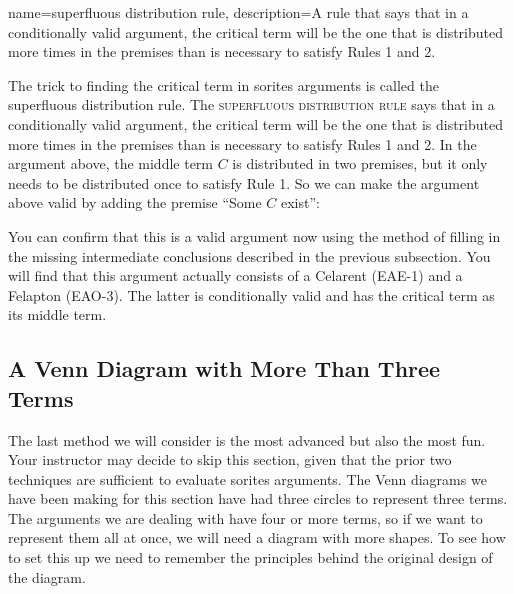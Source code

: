 {
name=superfluous distribution rule,
description={A rule that says that in a conditionally valid argument, the critical term will be the one that is distributed more times in the premises than is necessary to satisfy Rules 1 and 2.}
}

The trick to finding the critical term in sorites arguments is called the superfluous distribution rule. The \textsc{\gls{superfluous distribution rule}} \label{def:superfluous_distribution_rule} says that in a conditionally valid argument, the critical term will be the one that is distributed more times in the premises than is necessary to satisfy Rules 1 and 2. In the argument above, the middle term $C$ is distributed in two premises, but it only needs to be distributed once to satisfy Rule 1. So we can make the argument above valid by adding the premise ``Some $C$ exist'':


\begin{kormanize}
\end{kormanize}

You can confirm that this is a valid argument now using the method of filling in the missing intermediate conclusions described in the previous subsection. You will find that this argument actually consists of a Celarent (EAE-1) and a Felapton (EAO-3). The latter is conditionally valid and has the critical term as its middle term.

\subsection{A Venn Diagram with More Than Three Terms}

The last method we will consider is the most advanced but also the most fun. Your instructor may decide to skip this section, given that the prior two techniques are sufficient to evaluate sorites arguments. The Venn diagrams we have been making for this section have had three circles to represent three terms. The arguments we are dealing with have four or more terms, so if we want to represent them all at once, we will need a diagram with more shapes. To see how to set this up we need to remember the principles behind the original design of the diagram.


